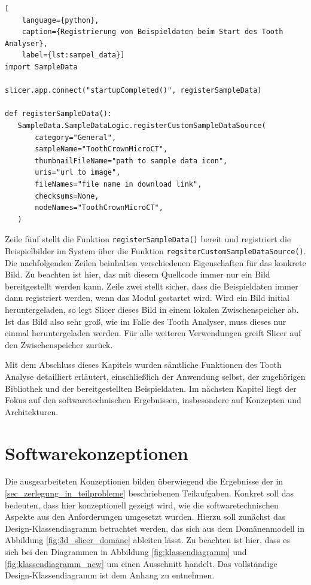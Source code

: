 \begin{lstlisting}[
    language={python},
    caption={Registrierung von Beispieldaten beim Start des Tooth Analyser},
    label={lst:sampel_data}]
import SampleData

slicer.app.connect("startupCompleted()", registerSampleData)

def registerSampleData():
   SampleData.SampleDataLogic.registerCustomSampleDataSource(
	   category="General",
	   sampleName="ToothCrownMicroCT",
	   thumbnailFileName="path to sample data icon",
	   uris="url to image",
	   fileNames="file name in download link",
	   checksums=None,
	   nodeNames="ToothCrownMicroCT",
   )
\end{lstlisting}

Zeile fünf stellt die Funktion \texttt{registerSampleData()} bereit und registriert
die Beispielbilder im System über die Funktion \texttt{regsiterCustomSampleDataSource()}.
Die nachfolgenden Zeilen beinhalten verschiedenen Eigenschaften für das konkrete
Bild. Zu beachten ist hier, das mit diesem Quellcode immer nur ein Bild bereitgestellt
werden kann. Zeile zwei stellt sicher, dass die Beispieldaten immer dann registriert
werden, wenn das Modul gestartet wird. Wird ein Bild initial heruntergeladen, so
legt Slicer dieses Bild in einem lokalen Zwischenspeicher ab. Ist das Bild also sehr
groß, wie im Falle des Tooth Analyser, muss dieses nur einmal heruntergeladen werden.
Für alle weiteren Verwendungen greift Slicer auf den Zwischenspeicher zurück.

Mit dem Abschluss dieses Kapitels wurden sämtliche Funktionen des Tooth Analyse
detailliert erläutert, einschließlich der Anwendung selbst, der zugehörigen
Bibliothek und der bereitgestellten Beispieldaten. Im nächsten Kapitel liegt der
Fokus auf den softwaretechnischen Ergebnissen, insbesondere auf Konzepten und
Architekturen.

\pagebreak

\section{Softwarekonzeptionen}
\label{sec:konzeptionen} Die ausgearbeiteten Konzeptionen bilden überwiegend die
Ergebnisse der in \ref{sec_zerlegung_in_teilprobleme} beschriebenen Teilaufgaben.
Konkret soll das bedeuten, dass hier konzeptionell gezeigt wird, wie die
softwaretechnischen Aspekte aus den Anforderungen umgesetzt wurden. Hierzu soll zunächst
das Design-Klassendiagramm betrachtet werden, das sich aus dem Domänenmodell in
Abbildung \ref{fig:3d_slicer_domäne} ableiten lässt. Zu beachten ist hier, dass
es sich bei den Diagrammen in Abbildung \ref{fig:klassendiagramm} und
\ref{fig:klassendiagramm_new} um einen Ausschnitt handelt. Das vollständige Design-Klassendiagramm
ist dem Anhang zu entnehmen.

